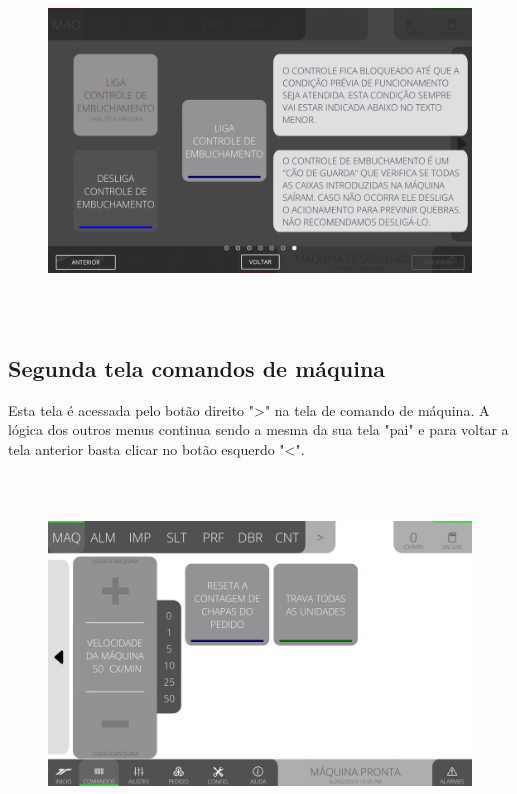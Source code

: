 \begin{figure}[h]
  \centering
  \includegraphics[width=576px,height=360px]{src/imagesFlexo/02-machine/e-7.png}
\end{figure}

\vspace*{\fill}

\newpage
\thispagestyle{fancy}

\vspace*{40 pt}

\subsection{Segunda tela comandos de máquina}\label{telaComandosMaquinaSegundaTelaComandosDeMaquina}

Esta tela é acessada pelo botão direito "\textgreater" na tela de comando de máquina. A lógica dos outros menus continua sendo a mesma da sua tela "pai" e para voltar a tela anterior basta clicar no botão esquerdo "\textless{}".

\vspace*{\fill}

\begin{figure}[h]
  \centering
  \includegraphics[width=576px,height=360px]{src/imagesMiniline/02-Machine/commands/e0.png}
\end{figure}

